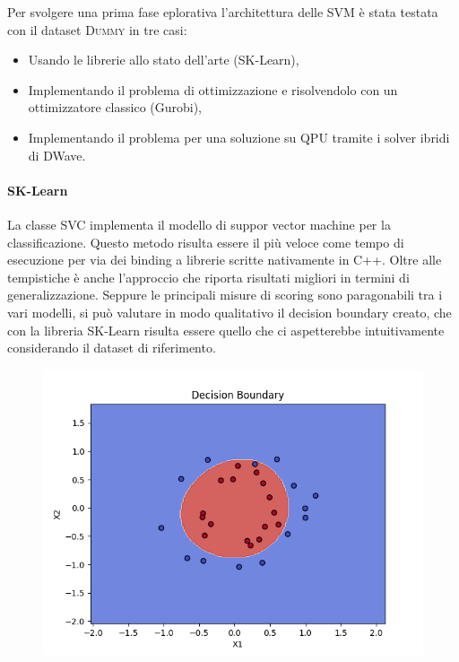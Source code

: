 \documentclass[12pt]{article}
\begin{document}
Per svolgere una prima fase eplorativa l'architettura delle SVM è stata testata con il dataset \textsc{Dummy} in tre casi:
\begin{itemize}
  \item Usando le librerie allo stato dell'arte (SK-Learn),
  \item Implementando il problema di ottimizzazione e risolvendolo con un ottimizzatore classico (Gurobi),
  \item Implementando il problema per una soluzione su QPU tramite i solver ibridi di DWave.
\end{itemize}

\paragraph{SK-Learn} La classe SVC implementa il modello di suppor vector machine per la classificazione.
Questo metodo risulta essere il più veloce come tempo di esecuzione per via dei binding a librerie scritte nativamente in \textsc{C++}.
Oltre alle tempistiche è anche l'approccio che riporta risultati migliori in termini di generalizzazione.
Seppure le principali misure di scoring sono paragonabili tra i vari modelli, si può valutare in modo qualitativo il decision boundary creato,
che con la libreria SK-Learn risulta essere quello che ci aspetterebbe intuitivamente considerando il dataset di riferimento.

\begin{figure}[H]
  \centering
  \includegraphics[width=\linewidth]{img/decision_boundary_sklearn.png}
\end{figure}
\end{document}

